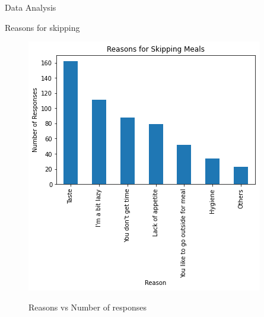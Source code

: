 \documentclass{beamer}
\begin{document}
\begin{frame}{Data Analysis}
\begin{block}{Reasons for skipping}
\begin{figure}
      \centering
    \caption{Reasons vs Number of responses }
    \includegraphics[scale = 0.55]{bar_reasons.png}  
    \label{bar_reasons}
\end{figure}
\end{block}
\end{frame}
\end{document}
